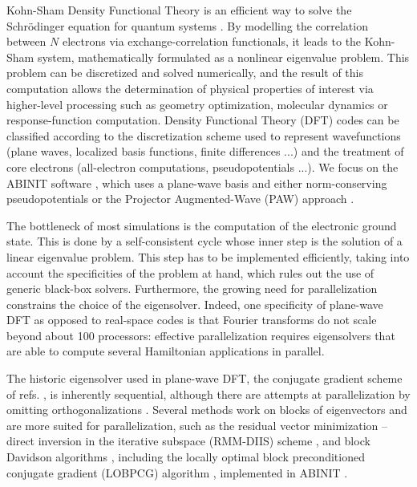 \documentclass[11pt]{elsarticle}
\begin{document}
Kohn-Sham Density Functional Theory is an efficient way to solve the
Schrödinger equation for quantum systems
\cite{hohenberg1964inhomogeneous, kohn1965self}. By modelling the
correlation between $N$ electrons via exchange-correlation
functionals, it leads to the Kohn-Sham system, mathematically
formulated as a nonlinear eigenvalue problem. This problem can be
discretized and solved numerically, and the result of this
computation allows the determination of physical properties of
interest via higher-level processing such as geometry optimization,
molecular dynamics or response-function computation. Density
Functional Theory (DFT) codes can be classified according to the
discretization scheme used to represent wavefunctions (plane waves,
localized basis functions, finite differences ...) and the treatment
of core electrons (all-electron computations, pseudopotentials
...). We focus on the ABINIT software \cite{gonze2009abinit}, which
uses a plane-wave basis and either norm-conserving pseudopotentials or
the Projector Augmented-Wave (PAW) approach
\cite{blochl1994projector,torrent2008implementation}.

The bottleneck of most simulations is the computation of the
electronic ground state. This is done by a self-consistent cycle whose
inner step is the solution of a linear eigenvalue problem. This step
has to be implemented efficiently, taking into account the
specificities of the problem at hand, which rules out the use of
generic black-box solvers. Furthermore, the growing need for
parallelization constrains the choice of the eigensolver. Indeed, one
specificity of plane-wave DFT as opposed to real-space codes is that
Fourier transforms do not scale beyond about 100 processors: effective
parallelization requires eigensolvers that are able to compute several
Hamiltonian applications in parallel.

The historic eigensolver used in plane-wave DFT, the conjugate
gradient scheme of refs. \cite{payne1992iterative,
  kresse1996efficient}, is inherently sequential, although there are
attempts at parallelization by omitting orthogonalizations
\cite{iwata2010massively}. Several methods work on blocks of
eigenvectors and are more suited for parallelization, such as the
residual vector minimization -- direct inversion in the iterative
subspace (RMM-DIIS) scheme \cite{kresse1996efficient}, and block
Davidson algorithms \cite{davidson1975iterative}, including the
locally optimal block preconditioned conjugate gradient (LOBPCG)
algorithm \cite{knyazev2001toward}, implemented in ABINIT
\cite{bottin2008large}.
\end{document}
